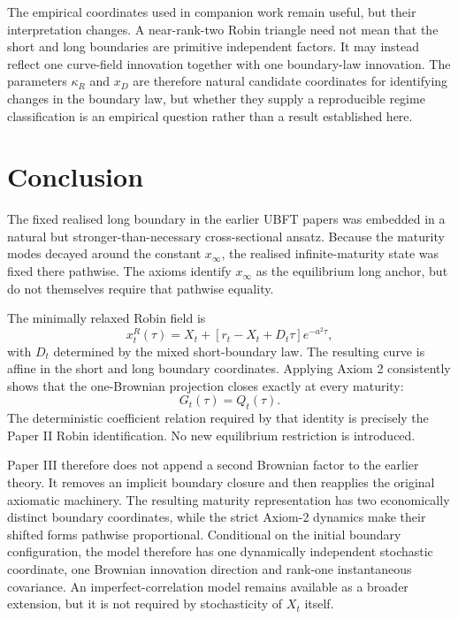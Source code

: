 \documentclass[11pt]{article}
\numberwithin{equation}{section}
\begin{document}
The empirical coordinates used in companion work remain useful, but their interpretation changes. A near-rank-two Robin triangle need not mean that the short and long boundaries are primitive independent factors. It may instead reflect one curve-field innovation together with one boundary-law innovation. The parameters $\kappa_R$ and $x_D$ are therefore natural candidate coordinates for identifying changes in the boundary law, but whether they supply a reproducible regime classification is an empirical question rather than a result established here.

\section{Conclusion}

The fixed realised long boundary in the earlier UBFT papers was embedded in a natural but stronger-than-necessary cross-sectional ansatz. Because the maturity modes decayed around the constant $x_\infty$, the realised infinite-maturity state was fixed there pathwise. The axioms identify $x_\infty$ as the equilibrium long anchor, but do not themselves require that pathwise equality.

The minimally relaxed Robin field is
\begin{equation}
 x_t^R(\tau)=X_t+[r_t-X_t+D_t\tau]e^{-a^2\tau},
\end{equation}
with $D_t$ determined by the mixed short-boundary law. The resulting curve is affine in the short and long boundary coordinates. Applying Axiom 2 consistently shows that the one-Brownian projection closes exactly at every maturity:
\begin{equation}
 G_t(\tau)=Q_t(\tau).
\end{equation}
The deterministic coefficient relation required by that identity is precisely the Paper II Robin identification. No new equilibrium restriction is introduced.

Paper III therefore does not append a second Brownian factor to the earlier theory. It removes an implicit boundary closure and then reapplies the original axiomatic machinery. The resulting maturity representation has two economically distinct boundary coordinates, while the strict Axiom-2 dynamics make their shifted forms pathwise proportional. Conditional on the initial boundary configuration, the model therefore has one dynamically independent stochastic coordinate, one Brownian innovation direction and rank-one instantaneous covariance. An imperfect-correlation model remains available as a broader extension, but it is not required by stochasticity of $X_t$ itself.
\end{document}
